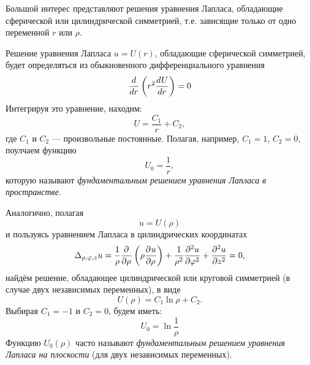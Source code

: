 Большой интерес представляют решения уравнения Лапласа, обладающие сферической или цилиндрической симметрией, т.е. зависящие только от одно переменной $r$ или $\rho$.

Решение уравнения Лапласа $u = U(r)$, обладающие сферической симметрией, будет определяться из обыкновенного дифференциального уравнения
\[
	\frac{d^{}}{dr^{}} \left(r^2 \frac{d^{}U}{dr^{}} \right) = 0
\]
Интегрируя это уравнение, находим:
\[
	U = \frac{C_1}{r} + C_2,
\]
где $C_1$ и $C_2$ --- произвольные постоянные. Полагая, например, $C_1 = 1$, $C_2 = 0$, поулчаем функцию
\begin{equation}
	U_0 = \frac{1}{r},
	\label{equ:equFundLaplace1}
\end{equation}
которую называют \textit{фундаментальным решением уравнения Лапласа в пространстве}.

Аналогично, полагая
\[
	u = U(\rho)
\]
и пользуясь уравнением Лапласа в цилиндрических координатах
\[
	\Delta_{\rho, \varphi, z} u = \frac{1}{\rho} \frac{\partial^{}}{\partial \rho^{}} \left(\rho \frac{\partial^{}u}{\partial \rho^{}} \right) + \frac{1}{\rho^2} \frac{\partial^{2}u}{\partial \varphi^{2}} + \frac{\partial^{2}u}{\partial z^{2}} = 0,
\]
найдём решение, обладающее цилиндрической или круговой симметрией (в случае двух независимых переменных), в виде
\[
	U(\rho) = C_1 \ln \rho + C_2.
\]
Выбирая $C_1 = -1$ и $C_2 = 0$, будем иметь:
\[
	U_0 = \ln \frac{1}{\rho}
\]
Функцию $U_0(\rho)$ часто называют \textit{фундаментальным решением уравнения Лапласа на плоскости} (для двух независимых переменных).

